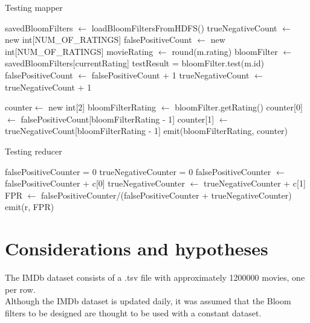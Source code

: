 \begin{algorithm}[H]
	\caption{Testing mapper} 
	\begin{algorithmic}[1]
			\State savedBloomFilters $\gets$ loadBloomFiltersFromHDFS()
			\State trueNegativeCount $\gets$ new int[NUM\_OF\_RATINGS]
        	\State falsePositiveCount $\gets$ new int[NUM\_OF\_RATINGS]
				\State movieRating $\gets$ round(m.rating)
	        		\State bloomFilter $\gets$ savedBloomFilters[currentRating]
	        		\State testResult = bloomFilter.test(m.id)
	        			\State falsePositiveCount $\gets$ falsePositiveCount + 1
	        		\EndIf
	        			\State trueNegativeCount $\gets$ trueNegativeCount + 1
	        		\EndIf
	        	\EndFor
	        \EndFor
	        
	        \State counter$\gets$ new int[2]
	        	\State bloomFilterRating $\gets$ bloomFilter.getRating()
				\State counter[0] $\gets$ falsePositiveCount[bloomFilterRating - 1]
				\State counter[1] $\gets$ trueNegativeCount[bloomFilterRating - 1]
				\State emit(bloomFilterRating, counter)
	        \EndFor
		\EndProcedure
	\end{algorithmic} 
\end{algorithm}

\begin{algorithm}[H]
	\caption{Testing reducer} 
	\begin{algorithmic}[1]
		\State falsePositiveCounter = 0
		\State trueNegativeCounter = 0
				\State falsePositiveCounter $\gets$ falsePositiveCounter  + c[0]
				\State trueNegativeCounter $\gets$ trueNegativeCounter + c[1]
			\EndIf
		\EndFor
			\State FPR $\gets$ falsePositiveCounter/(falsePositiveCounter + trueNegativeCounter)
			\State emit(r, FPR)
		\EndIf
		\EndProcedure
	\end{algorithmic} 
\end{algorithm}

\section{Considerations and hypotheses}
The IMDb dataset consists of a .tsv file with approximately 1200000 movies, one per row.\\
Although the IMDb dataset is updated daily, it was assumed that the Bloom filters to be designed are thought to be used with a constant dataset. 